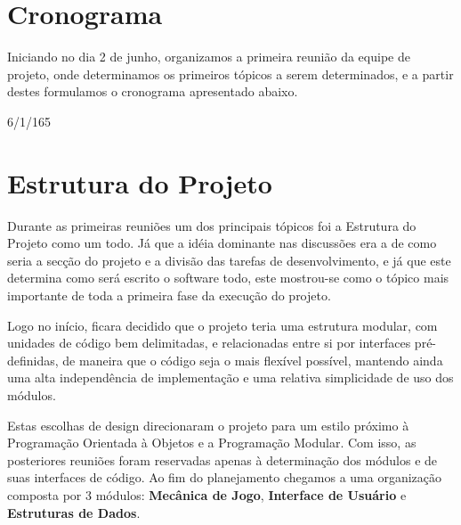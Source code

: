 \documentclass[10pt,a4paper]{report}
\begin{document}
\section{Cronograma}
Iniciando no dia 2 de junho, organizamos a primeira reunião da equipe de projeto, onde determinamos os primeiros tópicos a serem determinados, e a partir destes formulamos o cronograma apresentado abaixo.
\begin{calendar}{6/1/16}{5}
\setlength{\calboxdepth}{.3in}

\skipday\skipday
{}

\end{calendar}
\section{Estrutura do Projeto}
Durante as primeiras reuniões um dos principais tópicos foi a Estrutura do Projeto como um todo. Já que a idéia dominante nas discussões era a de como seria a secção do projeto e a divisão das tarefas de desenvolvimento, e já que este determina como será escrito o software todo, este mostrou-se como o tópico mais importante de toda a primeira fase da execução do projeto.

Logo no início, ficara decidido que o projeto teria uma estrutura modular, com unidades de código bem delimitadas, e relacionadas entre si por interfaces pré-definidas, de maneira que o código seja o mais flexível possível, mantendo ainda uma alta independência de implementação e uma relativa simplicidade de uso dos módulos.

Estas escolhas de design direcionaram o projeto para um estilo próximo à Programação Orientada à Objetos e a Programação Modular. Com isso, as posteriores reuniões foram reservadas apenas à determinação dos módulos e de suas interfaces de código. Ao fim do planejamento chegamos a uma organização composta por 3 módulos: \textbf{Mecânica de Jogo}, \textbf{Interface de Usuário} e \textbf{Estruturas de Dados}.
\end{document}
